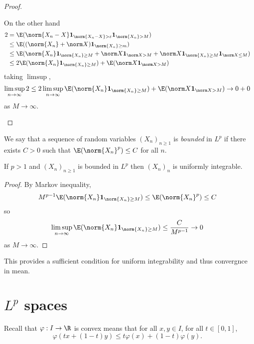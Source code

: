 \documentclass[a4paper]{article}
\begin{document}
\begin{proof}
\begin{itemize}
    On the other hand
    \begin{align*}
      2
      &= \E(\norm{X_n - X} \mathbf 1_{\norm{X_n - X} > \varepsilon} \mathbf 1_{\norm{X_n} > M}) \\
      &\leq \E((\norm{X_n} + \norm X) \mathbf 1_{\norm{X_n} \geq m}) \\
      &\leq \E(\norm{X_n} \mathbf 1_{\norm{X_n} \geq M} + \norm X \mathbf 1_{\norm X > M} + \norm X \mathbf 1_{\norm{X_n} \geq M} \mathbf 1_{\norm X \leq M}) \\
      &\leq 2 \E(\norm{X_n} \mathbf 1_{\norm{X_n} \geq M}) + \E(\norm X \mathbf 1_{\norm X > M})
    \end{align*}
    taking \(\limsup\),
    \[
      \limsup_{n \to \infty} 2 \leq 2 \limsup_{n \to \infty} \E(\norm{X_n} \mathbf 1_{\norm{X_n} \geq M}) + \E(\norm X \mathbf 1_{\norm X > M}) \to 0 + 0
    \]
    as \(M \to \infty\).
  \end{itemize}
\end{proof}

\begin{definition}
  We say that a sequence of random variables \((X_n)_{n \geq 1}\) is \emph{bounded} in \(L^p\) if there exists \(C > 0\) such that \(\E(\norm{X_n}^p) \leq C\) for all \(n\).
\end{definition}

\begin{proposition}
  If \(p > 1\) and \((X_n)_{n \geq 1}\) is bounded in \(L^p\) then \((X_n)_n\) is uniformly integrable.
\end{proposition}

\begin{proof}
  By Markov inequality,
  \[
    M^{p - 1} \E(\norm{X_n} \mathbf 1_{\norm{X_n} \geq M}) \leq \E( \norm{X_n}^p) \leq C
  \]
  so
  \[
    \limsup_{n \to \infty} \E(\norm{X_n} \mathbf 1_{\norm{X_n} \geq M}) \leq \frac{C}{M^{p - 1}} \to 0
  \]
  as \(M \to \infty\).
\end{proof}
This provides a sufficient condition for uniform integrability and thus convergnce in mean.

\section{\(L^p\) spaces}

Recall that \(\varphi: I \to \R\) is convex means that for all \(x, y \in I\), for all \(t \in [0, 1]\),
\[
  \varphi(tx + (1 - t) y) \leq t \varphi(x) + (1 - t) \varphi(y).
\]
\end{document}
